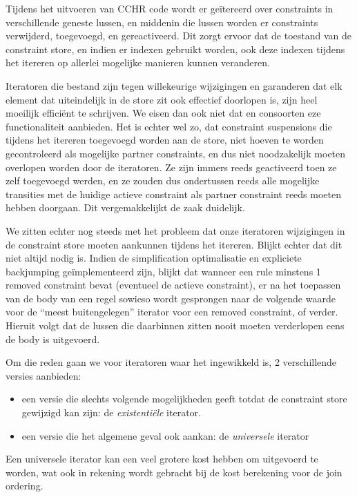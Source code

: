 Tijdens het uitvoeren van CCHR code wordt er ge\"itereerd over constraints in verschillende geneste lussen, en middenin die lussen worden er constraints verwijderd, toegevoegd, en gereactiveerd. Dit zorgt ervoor dat de toestand van de constraint store, en indien er indexen gebruikt worden, ook deze indexen tijdens het itereren op allerlei mogelijke manieren kunnen veranderen.

Iteratoren die bestand zijn tegen willekeurige wijzigingen en garanderen dat elk element dat uiteindelijk in de store zit ook effectief doorlopen is, zijn heel moeilijk effici\"ent te schrijven. We eisen dan ook niet dat  en consoorten eze functionaliteit aanbieden. Het is echter wel zo, dat constraint suspensions die tijdens het itereren toegevoegd worden aan de store, niet hoeven te worden gecontroleerd als mogelijke partner constraints, en dus niet noodzakelijk moeten overlopen worden door de iteratoren. Ze zijn immers reeds geactiveerd toen ze zelf toegevoegd werden, en ze zouden dus ondertussen reeds alle mogelijke transities met de huidige actieve constraint als partner constraint reeds moeten hebben doorgaan. Dit vergemakkelijkt de zaak duidelijk.

We zitten echter nog steeds met het probleem dat onze iteratoren wijzigingen in de constraint store moeten aankunnen tijdens het itereren. Blijkt echter dat dit niet altijd nodig is. Indien de simplification optimalisatie en expliciete backjumping ge\"implementeerd zijn, blijkt dat wanneer een rule minstens 1 removed constraint bevat (eventueel de actieve constraint), er na het toepassen van de body van een regel sowieso wordt gesprongen naar de volgende waarde voor de ``meest buitengelegen'' iterator voor een removed constraint, of verder. Hieruit volgt dat de lussen die daarbinnen zitten nooit moeten verderlopen eens de body is uitgevoerd.

Om die reden gaan we voor iteratoren waar het ingewikkeld is, 2 verschillende versies aanbieden: \begin{itemize}
\item een versie die slechts volgende mogelijkheden geeft totdat de constraint store gewijzigd kan zijn: de {\em existenti\"ele} iterator.
\item een versie die het algemene geval ook aankan: de {\em universele} iterator
\end{itemize}

Een universele iterator kan een veel grotere kost hebben om uitgevoerd te worden, wat ook in rekening wordt gebracht bij de kost berekening voor de join ordering.

